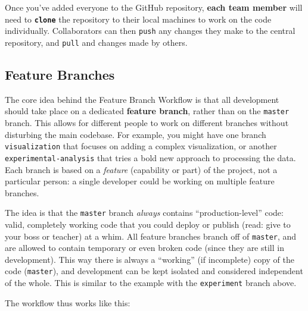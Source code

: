 \documentclass[]{book}
\theoremstyle{definition}
\theoremstyle{definition}
\theoremstyle{remark}
\begin{document}
Once you've added everyone to the GitHub repository, \textbf{each team
member} will need to \textbf{\texttt{clone}} the repository to their
local machines to work on the code individually. Collaborators can then
\texttt{push} any changes they make to the central repository, and
\texttt{pull} and changes made by others.

\subsection{Feature Branches}\label{feature-branches}

The core idea behind the Feature Branch Workflow is that all development
should take place on a dedicated \textbf{feature branch}, rather than on
the \texttt{master} branch. This allows for different people to work on
different branches without disturbing the main codebase. For example,
you might have one branch \texttt{visualization} that focuses on adding
a complex visualization, or another \texttt{experimental-analysis} that
tries a bold new approach to processing the data. Each branch is based
on a \emph{feature} (capability or part) of the project, not a
particular person: a single developer could be working on multiple
feature branches.

The idea is that the \texttt{master} branch \emph{always} contains
``production-level'' code: valid, completely working code that you could
deploy or publish (read: give to your boss or teacher) at a whim. All
feature branches branch off of \texttt{master}, and are allowed to
contain temporary or even broken code (since they are still in
development). This way there is always a ``working'' (if incomplete)
copy of the code (\texttt{master}), and development can be kept isolated
and considered independent of the whole. This is similar to the example
with the \texttt{experiment} branch above.

The workflow thus works like this:
\end{document}
